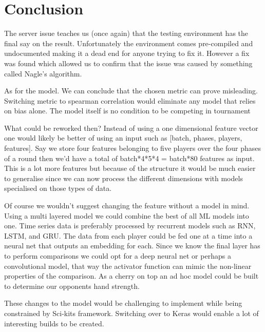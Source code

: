 \documentclass[../main.tex]{subfiles}
\begin{document}
\section{Conclusion}
The server issue teaches us (once again) that the testing environment has the final say on the result. Unfortunately the environment comes pre-compiled and undocumented making it a dead end for anyone trying to fix it. However a fix was found which allowed us to confirm that the issue was caused by something called Nagle's algorithm.

As for the model. We can conclude that the chosen metric can prove misleading. Switching metric to spearman correlation would eliminate any model that relies on bias alone. The model itself is no condition to be competing in tournament

What could be reworked then? Instead of using a one dimensional feature vector one would likely be better of using an input such as [batch, phases, players, features]. Say we store four features belonging to five players over the four phases of a round then we'd have a total of batch*4*5*4 = batch*80 features as input. This is a lot more features but because of the structure it would be much easier to generalise since we can now process the different dimensions with models specialised on those types of data. 

Of course we wouldn't suggest changing the feature without a model in mind. Using a multi layered model we could combine the best of all ML models into one. Time series data is preferably processed by recurrent models such as RNN, LSTM, and GRU. The data from each player could be fed one at a time into a neural net that outputs an embedding for each. Since we know the final layer has to perform comparisons we could opt for a deep neural net or perhaps a convolutional model, that way the activator function can mimic the non-linear properties of the comparison. As a cherry on top an ad hoc model could be built to determine our opponents hand strength.

These changes to the model would be challenging to implement while being constrained by Sci-kits framework. Switching over to Keras would enable a lot of interesting builds to be created.
\end{document}

